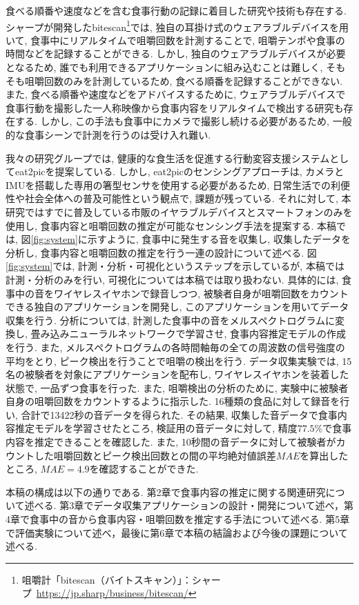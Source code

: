 食べる順番や速度などを含む食事行動の記録に着目した研究や技術も存在する. シャープが開発したbitescan\footnote{咀嚼計「bitescan（バイトスキャン）」：シャープ~\url{https://jp.sharp/business/bitescan/}}では, 独自の耳掛け式のウェアラブルデバイスを用いて, 食事中にリアルタイムで咀嚼回数を計測することで, 咀嚼テンポや食事の時間などを記録することができる. しかし, 独自のウェアラブルデバイスが必要となるため, 誰でも利用できるアプリケーションに組み込むことは難しく, そもそも咀嚼回数のみを計測しているため, 食べる順番を記録することができない. また, 食べる順番や速度などをアドバイスするために, ウェアラブルデバイスで食事行動を撮影した一人称映像から食事内容をリアルタイムで検出する研究も存在する\cite{10.1145/3551626.3564964}. しかし, この手法も食事中にカメラで撮影し続ける必要があるため, 一般的な食事シーンで計測を行うのは受け入れ難い.

我々の研究グループでは, 健康的な食生活を促進する行動変容支援システムとしてeat2picを提案している\cite{10.1145/3580784}. しかし, eat2picのセンシングアプローチは, カメラとIMUを搭載した専用の箸型センサを使用する必要があるため, 日常生活での利便性や社会全体への普及可能性という観点で, 課題が残っている. それに対して, 本研究ではすでに普及している市販のイヤラブルデバイスとスマートフォンのみを使用し, 食事内容と咀嚼回数の推定が可能なセンシング手法を提案する. 本稿では, 図\ref{fig:system}に示すように, 食事中に発生する音を収集し, 収集したデータを分析し, 食事内容と咀嚼回数の推定を行う一連の設計について述べる. 図\ref{fig:system}では, 計測・分析・可視化というステップを示しているが, 本稿では計測・分析のみを行い, 可視化については本稿では取り扱わない. 具体的には, 食事中の音をワイヤレスイヤホンで録音しつつ, 被験者自身が咀嚼回数をカウントできる独自のアプリケーションを開発し, このアプリケーションを用いてデータ収集を行う. 分析については, 計測した食事中の音をメルスペクトログラムに変換し, 畳み込みニューラルネットワークで学習させ, 食事内容推定モデルの作成を行う. また, メルスペクトログラムの各時間軸毎の全ての周波数の信号強度の平均をとり, ピーク検出を行うことで咀嚼の検出を行う. データ収集実験では, 15名の被験者を対象にアプリケーションを配布し, ワイヤレスイヤホンを装着した状態で, 一品ずつ食事を行った. また, 咀嚼検出の分析のために, 実験中に被験者自身の咀嚼回数をカウントするように指示した. 16種類の食品に対して録音を行い, 合計で13422秒の音データを得られた. その結果, 収集した音データで食事内容推定モデルを学習させたところ, 検証用の音データに対して, 精度$77.5\%$で食事内容を推定できることを確認した. また, 10秒間の音データに対して被験者がカウントした咀嚼回数とピーク検出回数との間の平均絶対値誤差$MAE$を算出したところ, $MAE = 4.9$を確認することができた.

本稿の構成は以下の通りである.
第2章で食事内容の推定に関する関連研究について述べる. 第3章でデータ収集アプリケーションの設計・開発について述べ，第4章で食事中の音から食事内容・咀嚼回数を推定する手法について述べる. 第5章で評価実験について述べ，最後に第6章で本稿の結論および今後の課題について述べる.
